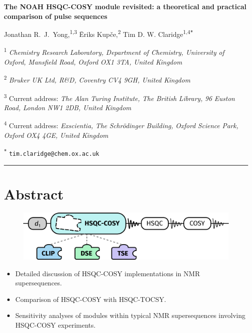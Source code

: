 \documentclass[a4paper,12pt]{article}
\newcommand{\me}{Jonathan R.\ J.\ Yong}
\newcommand{\eriks}{{\=E}riks Kup{\v{c}}e}
\newcommand{\tim}{Tim D. W. Claridge}
\newcommand{\articletitle}{The NOAH HSQC-COSY module revisited: a theoretical and practical comparison of pulse sequences}
\newcommand{\crl}{Chemistry Research Laboratory, Department of Chemistry, University of Oxford, Mansfield Road, Oxford OX1 3TA, United Kingdom}
\newcommand{\turing}{The Alan Turing Institute, The British Library, 96 Euston Road, London NW1 2DB, United Kingdom}
\newcommand{\brukeruk}{Bruker UK Ltd, R\&D, Coventry CV4 9GH, United Kingdom}
\newcommand{\exscientia}{Exscientia, The Schr{\"o}dinger Building, Oxford Science Park, Oxford OX4 4GE, United Kingdom}
\begin{document}
 \begin{refsection}

\begin{center}   %
    \textbf{\Large \articletitle{}}

    \vspace{0.2cm}

    \me{},\textsuperscript{1,3} \eriks{},\textsuperscript{2} \tim\textsuperscript{1,4\texttt{*}}

    \vspace{0.2cm}

    \small

    \textsuperscript{1} \textit{\crl{}}

    \textsuperscript{2} \textit{\brukeruk{}}

    \textsuperscript{3} Current address: \textit{\turing{}}

    \textsuperscript{4} Current address: \textit{\exscientia{}}

    \normalsize \textsuperscript{\texttt{*}} \texttt{tim.claridge@chem.ox.ac.uk}

    \vspace{0.5cm} \hrule

\end{center}

\section*{Abstract}
\begin{figure}[ht]
    \centering\includegraphics{toc.png}%
\end{figure}

\begin{itemize}
    \item Detailed discussion of HSQC-COSY implementations in NMR supersequences.
    \item Comparison of HSQC-COSY with HSQC-TOCSY.
    \item Sensitivity analyses of modules within typical NMR supersequences involving HSQC-COSY experiments.
\end{itemize}


\end{refsection}
\end{document}
